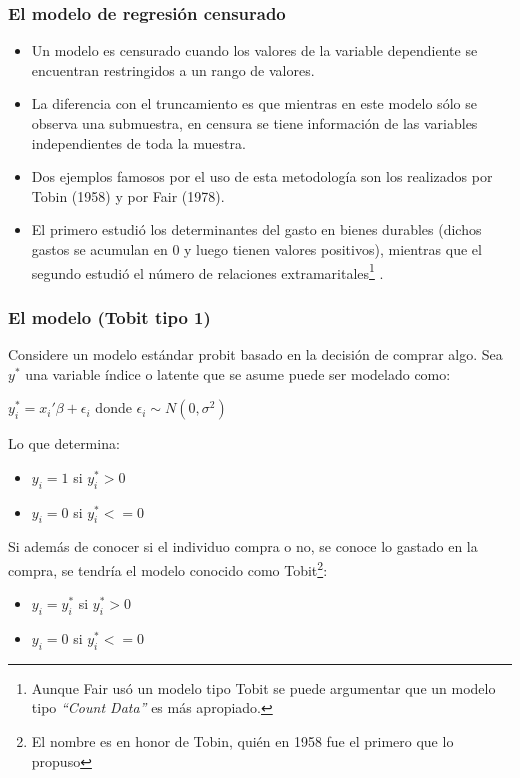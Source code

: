 \begin{frame}
	\frametitle{El modelo de regresión censurado}
	\begin{itemize}
		\item Un modelo es censurado cuando los valores
		de la variable dependiente se encuentran restringidos a un rango
		de valores. 
		\item La diferencia con el truncamiento es que mientras en
		este modelo sólo se observa una submuestra, en censura se tiene
		información de las variables independientes de toda la muestra.
		\item Dos ejemplos famosos por el uso de esta metodología son los
		realizados por Tobin (1958) y por Fair (1978). 
		\item El primero estudió los determinantes del gasto en bienes durables (dichos gastos se
		acumulan en 0 y luego tienen valores positivos), mientras que el
		segundo estudió el número de relaciones
		extramaritales\footnote{Aunque Fair usó un modelo tipo Tobit se
			puede argumentar que un modelo tipo \emph{``Count Data''} es más
			apropiado.} .
	\end{itemize}
\end{frame}

\begin{frame}
	\frametitle{El modelo (Tobit tipo 1)}
	Considere un modelo estándar probit basado en la decisión de
	comprar algo. Sea $y^*$ una variable índice o latente que se asume
	puede ser modelado como:
	
	\begin{center}
		$y_i^* = x_i'\beta+\epsilon_i $  donde   $ \epsilon_i \sim N(0,\sigma^2)$
	\end{center}
	
	Lo que determina:
	
	\begin{itemize}
		\item $y_i=1$ si $y_i^*>0$
		\item $y_i=0 $ si $y_i^* <= 0$
	\end{itemize}
	
	Si además de conocer si el individuo compra o no, se conoce lo
	gastado en la compra, se tendría el modelo conocido como
	Tobit\footnote{El nombre es en honor de Tobin, quién en 1958 fue
		el primero que lo propuso}:
	
	\begin{itemize}
		\item $y_i=y_i^*$ si $y_i^*>0$
		\item $y_i=0 $ si $y_i^* <= 0$
	\end{itemize}
\end{frame}

